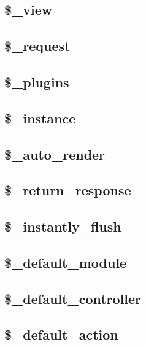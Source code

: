 \subsection{\$\_view}
\subsection{\$\_request}
\subsection{\$\_plugins}
\subsection{\$\_instance}
\subsection{\$\_auto\_render}
\subsection{\$\_return\_response}
\subsection{\$\_instantly\_flush}
\subsection{\$\_default\_module}
\subsection{\$\_default\_controller}
\subsection{\$\_default\_action}





\begin{lstlisting}[language=PHP]

\end{lstlisting}



\begin{lstlisting}[language=PHP]

\end{lstlisting}





\begin{lstlisting}[language=PHP]

\end{lstlisting}




